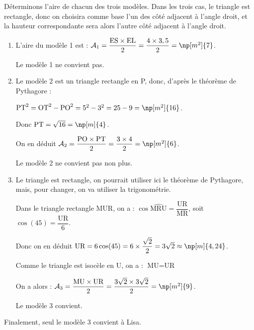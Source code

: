 
\medskip

Déterminons l'aire de chacun des trois modèles. Dans les trois cas, le triangle est rectangle, donc on choisira comme base l'un des côté adjacent à l'angle droit, et la hauteur correspondante sera alors l'autre côté adjacent à l'angle droit.


\begin{enumerate}
\item L'aire du modèle 1 est : $\mathcal{A}_1 = \dfrac{\text{ES}\times \text{EL}}{2} = \dfrac{4\times 3,5}{2} = \np[m^2]{7}$. 
	
Le modèle 1 ne convient pas.
	
	\item Le modèle 2 est un triangle rectangle en P{}, donc, d'après le théorème de Pythagore :
	
$\text{PT}^2 = \text{OT}^2 - \text{PO}^2 = 5^2-3^2 = 25 - 9 = \np[m^2]{16}$.
	
Donc $\text{PT} = \sqrt{16} = \np[m]{4}$.
	
On en déduit $\mathcal{A}_2 = \dfrac{\text{PO}\times \text{PT}}{2}=\dfrac{3\times 4}{2}= \np[m^2]{6}$.
	
Le modèle 2 ne convient pas non plus.
	
\item Le triangle est rectangle, on pourrait utiliser ici le théorème de Pythagore, mais, pour changer, on va utiliser la trigonométrie.
	
Dans le triangle rectangle MUR, on a : $\cos \widehat{\text{MRU}} = \dfrac{\text{UR}}{\text{MR}}$, soit $\cos(45) = \dfrac{\text{UR}}{6}$.
	
Donc on en déduit $\text{UR} = 6\cos(45) = 6\times \dfrac{\sqrt{2}}{2} = 3\sqrt{2}\approx \np[m]{4,24}$.
	
Comme le triangle est isocèle en U, on a : $\text{MU} = \text{UR}$
	
On a alors : $\mathcal{A}_3 = \dfrac{\text{MU}\times\text{UR}}{2} = \dfrac{3\sqrt{2}\times3\sqrt{2}}{2} = \np[m^2]{9}$.
	
Le modèle 3 convient.
\end{enumerate}

\medskip
 
Finalement, seul le modèle 3 convient à Lisa.
